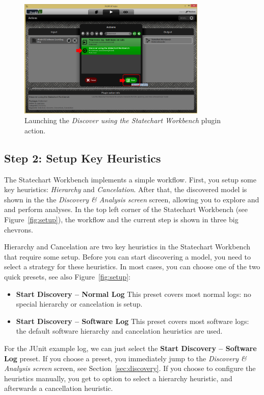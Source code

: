 \documentclass{article}
\begin{document}
\begin{figure}[ht!]
\centering
\includegraphics[width=0.8\textwidth]{gfx/start-plugin.png}
\caption{Launching the \emph{Discover using the Statechart Workbench} plugin action.}
\label{fig:start:plugin}
\end{figure}

\subsection{Step 2: Setup Key Heuristics}
The Statechart Workbench implements a simple workflow.
First, you setup some key heuristics: \emph{Hierarchy} and \emph{Cancelation}.
After that, the discovered model is shown in the the \emph{Discovery \& Analysis screen} screen,
allowing you to explore and and perform analyses.
In the top left corner of the Statechart Workbench (see Figure~\ref{fig:setup}), 
the workflow and the current step is shown in three big chevrons.

Hierarchy and Cancelation are two key heuristics in the Statechart Workbench that require some setup.
Before you can start discovering a model, you need to select a strategy for these heuristics.
In most cases, you can choose one of the two quick presets, see also Figure~\ref{fig:setup}:
\begin{itemize}
  \item \textbf{Start Discovery -- Normal Log} This preset covers most normal logs: no special hierarchy or cancelation is setup.
  \item \textbf{Start Discovery -- Software Log} This preset covers most software logs: the default software hierarchy and cancelation heuristics are used.
\end{itemize}

For the JUnit example log, we can just select the \textbf{Start Discovery -- Software Log} preset.
If you choose a preset, you immediately jump to the \emph{Discovery \& Analysis screen} screen, see Section~\ref{sec:discovery}.
If you choose to configure the heuristics manually, you get to option to select a hierarchy heuristic, and afterwards a cancellation heuristic.
\end{document}
